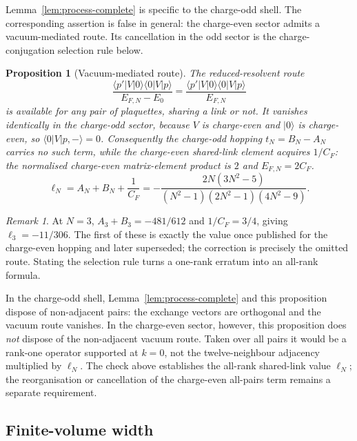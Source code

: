 \documentclass[11pt]{article}
\theoremstyle{plain}
\newtheorem{proposition}[theorem]{Proposition}
\theoremstyle{definition}
\theoremstyle{remark}
\newtheorem{remark}[theorem]{Remark}
\newcommand{\chk}[1]{}
\newcommand{\CF}{C_F}
\begin{document}
Lemma~\ref{lem:process-complete} is specific to the charge-odd shell. The
corresponding assertion is false in general: the charge-even sector admits a
vacuum-mediated route. Its cancellation in the odd sector is the
charge-conjugation selection rule below.

\begin{proposition}[Vacuum-mediated route]\label{prop:vacuum}
The reduced-resolvent route
\[
 \frac{\langle p'|V|0\rangle\langle 0|V|p\rangle}{E_{F,N}-E_0}
 =\frac{\langle p'|V|0\rangle\langle 0|V|p\rangle}{E_{F,N}}
\]
is available for any
pair of plaquettes, sharing a link or not. It vanishes identically in the
charge-odd sector, because $V$ is charge-even and $|0\rangle$ is charge-even,
so $\langle0|V|p,-\rangle=0$. Consequently the charge-odd hopping
$t_N=B_N-A_N$ carries no such term, while the charge-even shared-link element
acquires $1/\CF$: the normalised charge-even matrix-element product is $2$
and $E_{F,N}=2\CF$.
\[
  \ell_N=A_N+B_N+\frac1{\CF}
  =-\frac{2N(3N^2-5)}{(N^2-1)(2N^2-1)(4N^2-9)} .
\]
\end{proposition}
\chk{ell\_N = A\_N + B\_N + 1/C\_F, the vacuum-mediated route at every rank}

\begin{remark}
At $N=3$, $A_3+B_3=-481/612$ and $1/\CF=3/4$, giving $\ell_3=-11/306$. The
first of these is exactly the value once published for the charge-even hopping
and later superseded; the correction is precisely the omitted route. Stating
the selection rule turns a one-rank erratum into an all-rank formula.

In the charge-odd shell, Lemma~\ref{lem:process-complete} and this proposition
dispose of non-adjacent pairs: the exchange vectors are orthogonal and the
vacuum route vanishes. In the charge-even sector, however, this proposition
does \emph{not} dispose of the non-adjacent vacuum route. Taken over all pairs
it would be a rank-one operator supported at $k=0$, not the twelve-neighbour
adjacency multiplied by $\ell_N$. The check above establishes the all-rank
shared-link value $\ell_N$; the reorganisation or cancellation of the
charge-even all-pairs term remains a separate requirement.
\end{remark}

\subsection{Finite-volume width}
\end{document}
